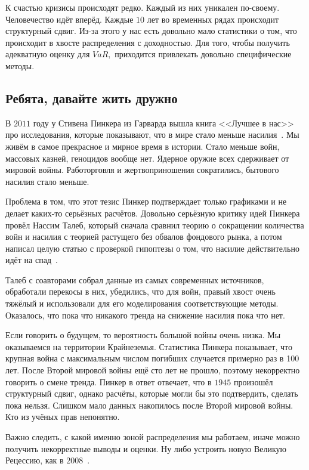 \documentclass[12pt, a4paper, oneside]{article}
\begin{document}
К счастью кризисы происходят редко. Каждый из них уникален по-своему. Человечество идёт вперёд. Каждые $10$ лет во временных рядах происходит структурный сдвиг. Из-за этого у нас есть довольно мало статистики о том, что происходит в хвосте распределения с доходностью. Для того, чтобы получить адекватную оценку для $VaR,$ приходится привлекать довольно специфические методы. 


\subsection{Ребята, давайте жить дружно}

В $2011$ году у Стивена Пинкера из Гарварда вышла книга <<Лучшее в нас>> про исследования, которые показывают, что в мире стало меньше насилия~\cite{ref:pinker}.  Мы живём в самое прекрасное и мирное время в истории. Стало меньше войн, массовых казней, геноцидов вообще нет. Ядерное оружие всех сдерживает от мировой войны. Работорговля и жертвоприношения сократились, бытового насилия стало меньше. 

Проблема в том, что этот тезис Пинкер подтверждает только графиками и не делает каких-то серьёзных расчётов. Довольно серьёзную критику идей Пинкера провёл Нассим Талеб, который сначала сравнил теорию о сокращении количества войн и насилия с теорией растущего без обвалов фондового рынка, а потом написал целую статью с проверкой гипоптезы о том, что насилие действительно идёт на спад~\cite{ref:taleb}. 

Талеб с соавторами собрал данные из самых современных источников, обработали перекосы в них, убедились, что для войн, правый хвост очень тяжёлый и использовали для его моделирования соответствующие методы. Оказалось, что пока что никакого тренда на снижение насилия пока что нет. 

Если говорить о будущем, то вероятность большой войны очень низка. Мы оказываемся на территории Крайнеземья. Статистика Пинкера показывает, что крупная война с максимальным числом погибших случается примерно раз в 100 лет. После Второй мировой войны ещё сто лет не прошло, поэтому некорректно говорить о смене тренда. Пинкер в ответ отвечает, что в $1945$ произошёл структурный сдвиг, однако расчёты, которые могли бы это подтвердить, сделать пока нельзя. Слишком мало данных накопилось после Второй мировой войны. Кто из учёных прав непонятно. 

Важно следить, с какой именно зоной распределения мы работаем, иначе можно получить некорректные выводы и оценки. Ну либо устроить новую Великую Рецессию, как в $2008$~\cite{ref:quants}. 
\end{document}
